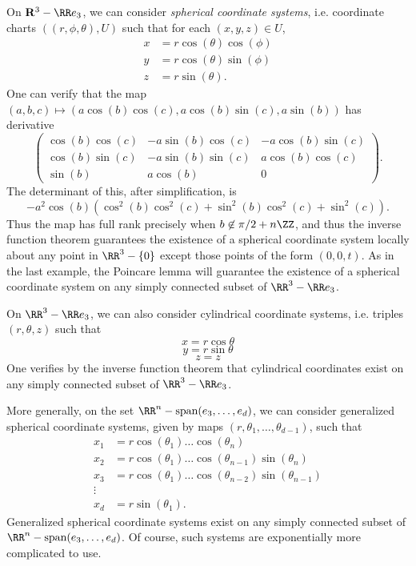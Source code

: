 \begin{example}
    On $\mathbf{R}^3 - \RR e_3$, we can consider \emph{spherical coordinate systems}, i.e. coordinate charts $((r,\phi,\theta), U)$ such that for each $(x,y,z) \in U$,
    \begin{align*}
        x &= r \cos(\theta) \cos(\phi)\\
        y &= r \cos(\theta) \sin(\phi)\\
        z &= r \sin(\theta).
    \end{align*}
    One can verify that the map $(a,b,c) \mapsto (a \cos(b) \cos(c), a \cos(b) \sin(c), a \sin(b))$ has derivative
    \[ \begin{pmatrix} \cos(b) \cos(c) & -a \sin(b) \cos(c) & - a \cos(b) \sin(c) \\ \cos(b) \sin(c) & - a \sin(b) \sin(c) & a \cos(b) \cos(c) \\ \sin(b) & a \cos(b) & 0 \end{pmatrix}. \]
    The determinant of this, after simplification, is
    \[ -a^2 \cos(b) (\cos^2(b) \cos^2(c) + \sin^2(b) \cos^2(c) + \sin^2(c)). \]
    Thus the map has full rank precisely when $b \not \in \pi/2 + n \ZZ$, and thus the inverse function theorem guarantees the existence of a spherical coordinate system locally about any point in $\RR^3 - \{ 0 \}$ except those points of the form $(0,0,t)$. As in the last example, the Poincare lemma will guarantee the existence of a spherical coordinate system on any simply connected subset of $\RR^3 - \RR e_3$.
\end{example}

\begin{example}
    On $\RR^3 - \RR e_3$, we can also consider cylindrical coordinate systems, i.e. triples $(r,\theta,z)$ such that
    \[ x = r \cos \theta \]
    \[ y = r \sin \theta \]
    \[ z = z \]
    One verifies by the inverse function theorem that cylindrical coordinates exist on any simply connected subset of $\RR^3 - \RR e_3$.
\end{example}

\begin{example}
    More generally, on the set $\RR^n - \text{span}(e_3, \dots, e_d)$, we can consider generalized spherical coordinate systems, given by maps $(r,\theta_1, \dots, \theta_{d-1})$, such that
    \begin{align*}
        x_1 &= r \cos(\theta_1) \dots \cos(\theta_n)\\
        x_2 &= r \cos(\theta_1) \dots \cos(\theta_{n-1}) \sin(\theta_n)\\
        x_3 &= r \cos(\theta_1) \dots \cos(\theta_{n-2}) \sin(\theta_{n-1})\\
        \vdots\\
        x_d &= r \sin(\theta_1).
    \end{align*}
    Generalized spherical coordinate systems exist on any simply connected subset of $\RR^n - \text{span}(e_3, \dots, e_d)$. Of course, such systems are exponentially more complicated to use.
\end{example} 

